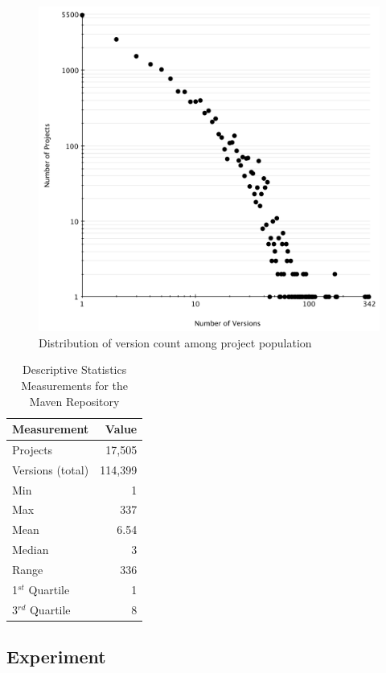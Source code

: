 \documentclass[conference]{IEEEtran}
\begin{document}
\begin{figure}
	\centering
	\includegraphics[scale=0.6]{version_count.pdf}
	\caption{Distribution of version count among project population}
	\label{fig:version-count}
\end{figure}

\begin{table}
\centering
\caption{Descriptive Statistics Measurements for the Maven Repository}
\label{tbl:repository}
\begin{tabular}{l r}
\hline
Measurement & Value\\
 \hline
Projects & 17,505\\
Versions (total) & 114,399\\
Min & 1\\
Max & 337\\
Mean & 6.54\\
Median & 3\\
Range & 336\\
1$^{st}$ Quartile & 1\\
3$^{rd}$ Quartile & 8\\
\hline
\end{tabular}
\end{table}

\subsection{Experiment}
\label{sec:exp}
\end{document}
